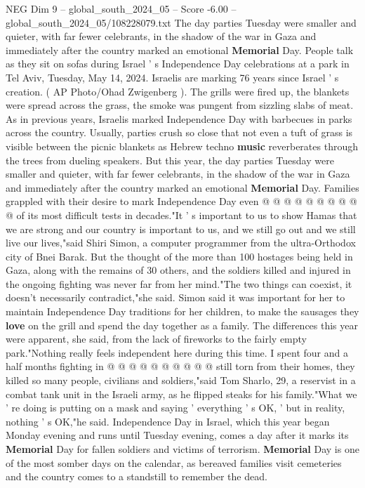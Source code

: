 \begin{textsample}{NEG Dim 9 – global\_south\_2024\_05 – Score -6.00 – global\_south\_2024\_05/108228079.txt}  \label{ex:f9_neg_402}
The day parties Tuesday were smaller and quieter, with far fewer celebrants, in the shadow of the war in Gaza and immediately after the country marked an emotional \textbf{Memorial} Day.
People talk as they sit on sofas during Israel ' s Independence Day celebrations at a park in Tel Aviv, Tuesday, May 14, 2024.
Israelis are marking 76 years since Israel ' s creation. ( AP Photo/Ohad Zwigenberg ).
The grills were fired up, the blankets were spread across the grass, the smoke was pungent from sizzling slabs of meat.
As in previous years, Israelis marked Independence Day with barbecues in parks across the country.
Usually, parties crush so close that not even a tuft of grass is visible between the picnic blankets as Hebrew techno \textbf{music} reverberates through the trees from dueling speakers.
But this year, the day parties Tuesday were smaller and quieter, with far fewer celebrants, in the shadow of the war in Gaza and immediately after the country marked an emotional \textbf{Memorial} Day.
Families grappled with their desire to mark Independence Day even @ @ @ @ @ @ @ @ @ @ of its most difficult tests in decades."It ' s important to us to show Hamas that we are strong and our country is important to us, and we still go out and we still live our lives,"said Shiri Simon, a computer programmer from the ultra-Orthodox city of Bnei Barak.
But the thought of the more than 100 hostages being held in Gaza, along with the remains of 30 others, and the soldiers killed and injured in the ongoing fighting was never far from her mind."The two things can coexist, it doesn't necessarily contradict,"she said.
Simon said it was important for her to maintain Independence Day traditions for her children, to make the sausages they \textbf{love} on the grill and spend the day together as a family.
The differences this year were apparent, she said, from the lack of fireworks to the fairly empty park."Nothing really feels independent here during this time.
I spent four and a half months fighting in @ @ @ @ @ @ @ @ @ @ still torn from their homes, they killed so many people, civilians and soldiers,"said Tom Sharlo, 29, a reservist in a combat tank unit in the Israeli army, as he flipped steaks for his family."What we ' re doing is putting on a mask and saying ' everything ' s OK, ' but in reality, nothing ' s OK,"he said.
Independence Day in Israel, which this year began Monday evening and runs until Tuesday evening, comes a day after it marks its \textbf{Memorial} Day for fallen soldiers and victims of terrorism. \textbf{Memorial} Day is one of the most somber days on the calendar, as bereaved families visit cemeteries and the country comes to a standstill to remember the dead.

\end{textsample}
